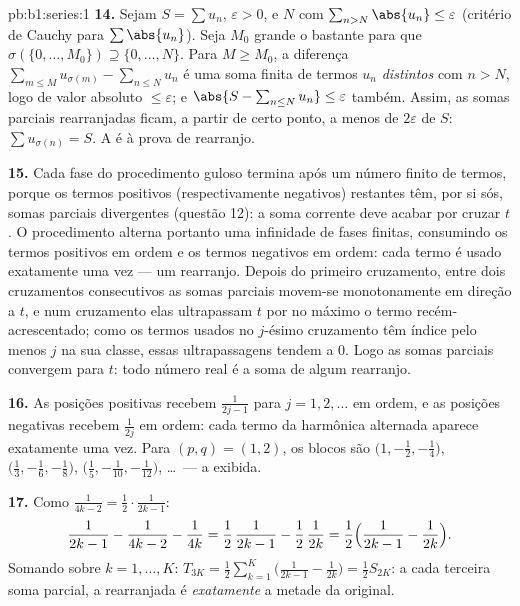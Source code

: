 \begin{solution}{pb:b1:series:1}
\textbf{14.} Sejam $S = \sum u_n$, $\varepsilon > 0$, e $N$ com
$\sum_{n > N} \abs{u_n} \leq \varepsilon$ (critério de Cauchy para
$\sum\abs{u_n}$). Seja $M_0$ grande o bastante para que $\sigma(\{0,
\dots, M_0\}) \supseteq \{0, \dots, N\}$. Para $M \geq M_0$, a
diferença $\sum_{m \leq M} u_{\sigma(m)} - \sum_{n \leq N} u_n$
é uma soma finita de termos $u_n$ \emph{distintos} com $n > N$,
logo de valor absoluto $\leq \varepsilon$; e $\abs{S -
\sum_{n\leq N} u_n} \leq \varepsilon$ também. Assim, as somas
parciais rearranjadas ficam, a partir de certo ponto, a menos de
$2\varepsilon$ de $S$: $\sum u_{\sigma(n)} = S$. A  é
à prova de rearranjo.

\textbf{15.} Cada fase do procedimento guloso termina após um
número finito de termos, porque os termos positivos
(respectivamente negativos) restantes têm, por si sós, somas
parciais divergentes (questão 12): a soma corrente deve acabar por
cruzar $t$. O procedimento alterna portanto uma infinidade de
fases finitas, consumindo os termos positivos em ordem e os termos
negativos em ordem: cada termo é usado exatamente uma vez --- um
rearranjo. Depois do primeiro cruzamento, entre dois cruzamentos
consecutivos as somas parciais movem-se monotonamente em direção a
$t$, e num cruzamento elas ultrapassam $t$ por no máximo o termo
recém-acrescentado; como os termos usados no $j$-ésimo cruzamento
têm índice pelo menos $j$ na sua classe, essas ultrapassagens
tendem a $0$. Logo as somas parciais convergem para $t$: todo
número real é a soma de algum rearranjo.

\textbf{16.} As posições positivas recebem $\frac{1}{2j-1}$ para
$j = 1, 2, \dots$ em ordem, e as posições negativas recebem $\frac{1}{2j}$ em
ordem: cada termo da  harmônica alternada aparece
exatamente uma vez. Para $(p, q) = (1, 2)$, os blocos são
$\bigl(1, -\frac12, -\frac14\bigr)$, $\bigl(\frac13, -\frac16,
-\frac18\bigr)$, $\bigl(\frac15, -\frac1{10},
-\frac1{12}\bigr)$, \dots\ --- a  exibida.

\textbf{17.} Como $\frac{1}{4k-2} = \frac12\cdot\frac{1}{2k-1}$:
\[
\frac{1}{2k-1} - \frac{1}{4k-2} - \frac{1}{4k}
= \frac12\,\frac{1}{2k-1} - \frac12\,\frac{1}{2k}
= \frac12\Bigl(\frac{1}{2k-1} - \frac{1}{2k}\Bigr).
\]
Somando sobre $k = 1, \dots, K$: $T_{3K} = \frac12
\sum_{k=1}^{K}\bigl(\frac{1}{2k-1} - \frac{1}{2k}\bigr) =
\frac12 S_{2K}$: a cada terceira soma parcial, a 
rearranjada é \emph{exatamente} a metade da original.


\end{solution}
